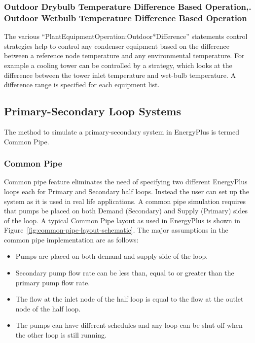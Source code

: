 \subsubsection{Outdoor Drybulb Temperature Difference Based Operation,. Outdoor Wetbulb Temperature Difference Based Operation}\label{outdoor-drybulb-temperature-difference-based-operation.-outdoor-wetbulb-temperature-difference-based-operation}

The various ``PlantEquipmentOperation:Outdoor*Difference'' statements control strategies help to control any condenser equipment based on the difference between a reference node temperature and any environmental temperature. For example a cooling tower can be controlled by a strategy, which looks at the difference between the tower inlet temperature and wet-bulb temperature. A difference range is specified for each equipment list.

\subsection{Primary-Secondary Loop Systems}\label{primary-secondary-loop-systems}

The method to simulate a primary-secondary system in EnergyPlus is termed Common Pipe.

\subsubsection{Common Pipe}\label{common-pipe}

Common pipe feature eliminates the need of specifying two different EnergyPlus loops each for Primary and Secondary half loops. Instead the user can set up the system as it is used in real life applications. A common pipe simulation requires that pumps be placed on both Demand (Secondary) and Supply (Primary) sides of the loop. A typical Common Pipe layout as used in EnergyPlus is shown in Figure~\ref{fig:common-pipe-layout-schematic}. The major assumptions in the common pipe implementation are as follows:

\begin{itemize}
\item
  Pumps are placed on both demand and supply side of the loop.
\item
  Secondary pump flow rate can be less than, equal to or greater than the primary pump flow rate.
\item
  The flow at the inlet node of the half loop is equal to the flow at the outlet node of the half loop.
\item
  The pumps can have different schedules and any loop can be shut off when the other loop is still running.
\end{itemize}

